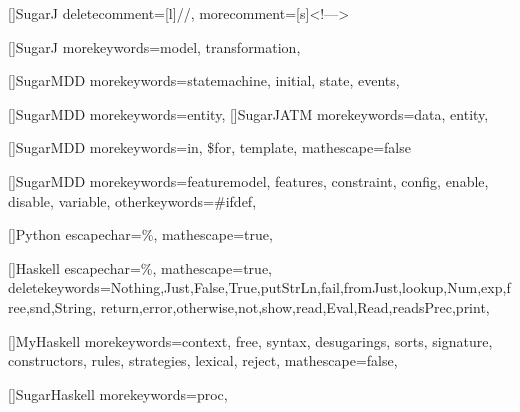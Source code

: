 []{SugarJ}{%
  deletecomment=[l]{//},
  morecomment=[s]{<!--}{-->}
}

[]{SugarJ}{%
  morekeywords={model, transformation},
}

[]{SugarMDD}{%
  morekeywords={statemachine, initial, state, events},
}

[]{SugarMDD}{%
  morekeywords={entity},
}
[]{SugarJATM}{%
  morekeywords={data, entity},
}

[]{SugarMDD}{%
  morekeywords={in, \$for, template},
  mathescape=false
}

[]{SugarMDD}{%
  morekeywords={featuremodel, features, constraint, config, enable, disable, variable},
  otherkeywords={\#ifdef},
}





[]{Python}{%
  escapechar=\%,
  mathescape=true,
}

[]{Haskell}{%
  escapechar=\%,
  mathescape=true,
  deletekeywords={Nothing,Just,False,True,putStrLn,fail,fromJust,lookup,Num,exp,free,snd,String,
  return,error,otherwise,not,show,read,Eval,Read,readsPrec,print},
}


[]{MyHaskell}{%
  morekeywords={context, free, syntax, desugarings, sorts, signature,
    constructors, rules, strategies, lexical, reject},
  mathescape=false,
}

[]{SugarHaskell}{%
  morekeywords={proc},
}




